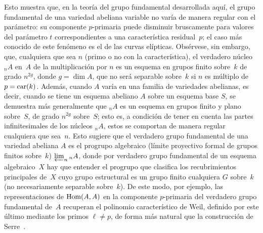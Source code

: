 Esto muestra que, en la teoría del grupo fundamental desarrollada aquí, el
grupo fundamental de una variedad abeliana variable no varía de manera
regular con el parámetro: su componente $p$-primaria puede disminuir
bruscamente para valores del parámetro $t$ correspondientes a una
característica residual~$p$; el caso más conocido de este fenómeno es el de
las curvas elípticas. Obsérvese, sin embargo, que, cualquiera que sea $n$
(primo o no con la característica), el verdadero núcleo ${}_nA$ en~$A$ de
la multiplicación por $n$ es un esquema en grupos finito sobre~$k$ de grado
$n^{2g}$, donde $g=\dim A$, que no será separable sobre~$k$ si $n$ es
múltiplo de~$p=\operatorname{car}(k)$. Además, cuando $A$ varía en una familia de
variedades abelianas, es decir, cuando se tiene un esquema abeliano $A$
sobre un esquema base $S$, se demuestra más generalmente que ${}_nA$ es un
esquema en grupos finito y plano sobre~$S$, de grado $n^{2g}$ sobre~$S$;
esto es, a condición de tener en cuenta las partes infinitesimales de los
núcleos ${}_nA$, estos se comportan de manera regular cualquiera que
sea~$n$. Esto sugiere que el \og verdadero\fg{} grupo fundamental de una
variedad abeliana $A$ es el progrupo algebraico (límite proyectivo formal
de grupos finitos sobre~$k$) $\varprojlim_n{{}_nA}$, donde por \og verdadero
grupo fundamental\fg{} de un esquema algebraico~$X$ hay que entender el
progrupo que clasifica los recubrimientos principales de~$X$ cuyo grupo
estructural es un grupo finito cualquiera $G$ sobre~$k$ (no necesariamente
separable sobre~$k$). De este modo, por ejemplo, las representaciones de
$\operatorname{Hom}(A,A)$ en la componente $p$-primaria del verdadero grupo fundamental
de~$A$ recuperan el polinomio característico de Weil, definido por este
último mediante los primos $\ell\neq p$, de forma más natural que la
construcción de Serre~\cite{XI.8}.
